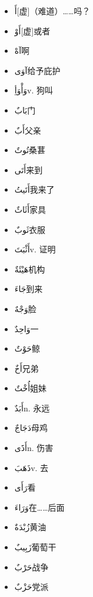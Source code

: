 \begin{itemize}
    \item {} \ac{أَ}{[虚]（难道）……吗？}
    \item \ac{أَوْ}{[虚]或者}
    \item \ac{آهْ}{啊}
    \item \ac{آوَى}{给予庇护}
    \item \ac{وَأْوَأِ}{v. 狗叫}

    \item {} \ac{بَابٌ}{门}
    \item \ac{أَبٌ}{父亲}
    \item \ac{تُوتٌ}{桑葚}
    \item \ac{أَتَى}{来到}
    \item \ac{أَتَيتُ}{我来了}
    \item \ac{أَثَاثٌ}{家具}
    \item \ac{ثَوبٌ}{衣服}
    \item \ac{أَثْبَتَ}{v. 证明}
    \item \ac{هَيْئَةٌ}{机构}

    \item {} \ac{جَاءَ}{到来}
    \item \ac{وَجْهٌ}{脸}
    \item \ac{وَاحِدٌ}{一}
    \item \ac{حَوْتٌ}{鲸}
    \item \ac{أَخٌ}{兄弟}
    \item \ac{أُخْتٌ}{姐妹}
    \item \ac{أَبَدٌ}{n. 永远}
    \item \ac{دَجَاجٌ}{母鸡}
    \item \ac{أَذََى}{n. 伤害}
    \item \ac{ذَهَبَ}{v. 去}
    \item \ac{رَأَى}{看}
    \item \ac{وَرَاءَ}{在……后面}
    \item \ac{زُبْدَةٌ}{黄油}
    \item \ac{زَبِيبٌ}{葡萄干}
    \item \ac{حَرْبٌ}{战争}
    \item \ac{حَزْبٌ}{党派}
    

\end{itemize}
